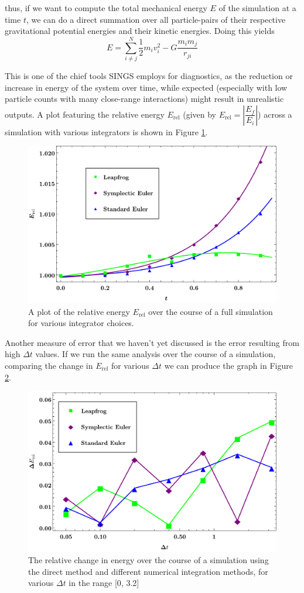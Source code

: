 \documentclass[12pt, twoside, letterpaper]{article}
\begin{document}
\noindent thus, if we want to compute the total mechanical energy $E$ of the simulation at a time $t$, we can do a direct summation over all particle-pairs of their respective gravitational potential energies and their kinetic energies. Doing this yields
\begin{equation} \label{eq:totenergy}
	E = \sum_{i \neq j}^{N} \frac{1}{2}m_iv_i^2 - G\frac{m_im_j}{r_{ji}}
\end{equation}

This is one of the chief tools SINGS employs for diagnostics, as the reduction or increase in energy of the system over time, while expected (especially with low particle counts with many close-range interactions) might result in unrealistic outputs. A plot featuring the relative energy $E_{\text{rel}}$ (given by $E_{\text{rel}} = \left|\dfrac{E_f}{E_i}\right|$) across a simulation with various integrators is shown in Figure \ref{fig:energyerror}.
\begin{figure}[h]
\caption{A plot of the relative energy $E_{\text{rel}}$ over the course of a full simulation for various integrator choices.}
\centerline{\includegraphics[width=.75\textwidth]{energyerror.pdf}}
\label{fig:energyerror}
\end{figure}

Another measure of error that we haven't yet discussed is the error resulting from high $\Delta t$ values. If we run the same analysis over the course of a simulation, comparing the change in $E_{\text{rel}}$ for various $\Delta t$ we can produce the graph in Figure \ref{fig:energydeltat}.
\begin{figure}[h!]
\caption{The relative change in energy over the course of a simulation using the direct method and different numerical integration methods, for various $\Delta t$ in the range [0, 3.2]}
\centerline{\includegraphics[width=.72\textwidth]{energydeltat.pdf}}
\label{fig:energydeltat}
\end{figure}
\end{document}
